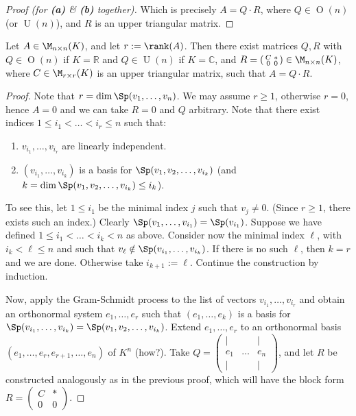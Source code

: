 \begin{proof}[Proof (for \textbf{(a)} \& \textbf{(b)} together)]
Which is precisely $A = Q \cdot R$, where $Q \in \operatorname{O}(n)$ (or $\operatorname{U}(n)$), and $R$ is an upper triangular matrix.
\end{proof}

\begin{theorem}
\label{thm:qr_decomposition_all}
Let $A \in \M_{n \times n}(K)$, and let $r := \rank(A)$. Then there exist matrices $Q, R$ with $Q \in \operatorname{O}(n)$ if $K = \mathbb{R}$ and $Q \in \operatorname{U}(n)$ if $K = \mathbb{C}$, and $R = \left(\begin{smallmatrix} C & * \\ 0 & 0 \end{smallmatrix}\right) \in \M_{n \times n}(K)$, where $C \in \M_{r \times r}(K)$ is an upper triangular matrix, such that $A = Q \cdot R$.
\end{theorem}

\begin{proof}
Note that $r = \dim \Sp(v_1, \dots, v_n)$.
We may assume $r \geq 1$, otherwise $r = 0$, hence $A = 0$ and we can take $R = 0$ and $Q$ arbitrary.
Note that there exist indices $1 \leq i_1 < \dots < i_r \leq n$ such that:
\begin{enumerate}
    \item $v_{i_1}, \dots, v_{i_r}$ are linearly independent.
    \item $(v_{i_1}, \dots, v_{i_k})$ is a basis for $\Sp(v_1, v_2, \dots, v_{i_k})$ (and $k = \dim \Sp(v_1, v_2, \dots, v_{i_k}) \leq i_k$).
\end{enumerate}
To see this, let $1 \leq i_1$ be the minimal index $j$ such that $v_j \neq 0$. (Since $r \geq 1$, there exists such an index.) Clearly $\Sp(v_1, \dots, v_{i_1}) = \Sp(v_{i_1})$. Suppose we have defined $1 \leq i_1 < \dots < i_k < n$ as above. Consider now the minimal index $\ell$, with $i_k < \ell \leq n$ and such that $v_\ell \notin \Sp(v_{i_1}, \dots, v_{i_k})$. If there is no such $\ell$, then $k = r$ and we are done. Otherwise take $i_{k+1} := \ell$. Continue the construction by induction.

Now, apply the Gram-Schmidt process to the list of vectors $v_{i_1}, \dots, v_{i_r}$ and obtain an orthonormal system $e_1, \dots, e_r$ such that $(e_1, \dots, e_k)$ is a basis for $\Sp(v_{i_1}, \dots, v_{i_k}) = \Sp(v_1, v_2, \dots, v_{i_k})$.
Extend $e_1, \dots, e_r$ to an orthonormal basis $(e_1, \dots, e_r, e_{r+1}, \dots, e_n)$ of $K^n$ (how?). Take $Q = \left(\begin{smallmatrix} | & & | \\ e_1 & \dots & e_n \\ | & & | \end{smallmatrix}\right)$, and let $R$ be constructed analogously as in the previous proof, which will have the block form $R = \left(\begin{smallmatrix} C & * \\ 0 & 0 \end{smallmatrix}\right)$.
\end{proof}

